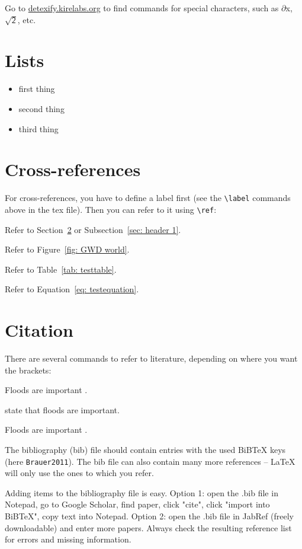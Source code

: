 \documentclass[twocolumn, 10pt, a4paper]{article}
\begin{document}
Go to \url{detexify.kirelabs.org} to find commands for special characters, such as $\partial$x, $\sqrt{\mathsf{2}}$, etc.



\section{Lists}

\begin{itemize}
\item first thing
\item second thing
\item third thing
\end{itemize}



\section{Cross-references} 
\label{sec: header 2}

For cross-references, you have to define a label first (see the \verb|\label| commands above in the tex file). Then you can refer to it using \verb|\ref|:

Refer to Section~\ref{sec: header 2} or Subsection~\ref{sec: header 1}.

Refer to Figure~\ref{fig: GWD world}.

Refer to Table~\ref{tab: testtable}.

Refer to Equation~\ref{eq: testequation}.



\section{Citation} 
There are several commands to refer to literature, depending on where you want the brackets: 

Floods are important \citep{Brauer2011}.

\cite{Brauer2011} state that floods are important.

Floods are important \citep[according to][]{Brauer2011}.

The bibliography (bib) file should contain entries with the used BiBTeX keys (here \verb!Brauer2011!). The bib file can also contain many more references -- LaTeX will only use the ones to which you refer. 

Adding items to the bibliography file is easy. Option 1: open the .bib file in Notepad, go to Google Scholar, find paper, click "cite", click "import into BiBTeX", copy text into Notepad. Option 2: open the .bib file in JabRef (freely downloadable) and enter more papers. Always check the resulting reference list for errors and missing information. 
\end{document}
